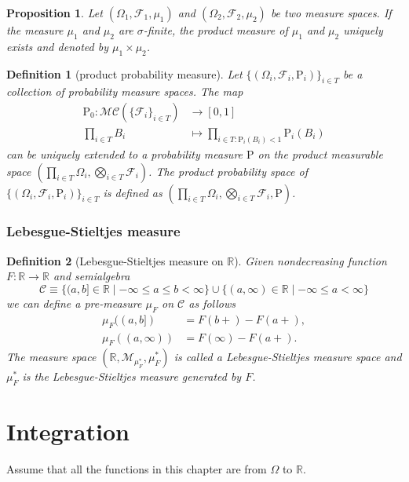 \documentclass{report}
\newtheorem{definition}{Definition}[section]
\newtheorem{proposition}{Proposition}[section]
\theoremstyle{nonumberplain}
\begin{document}
\begin{proposition}
	Let $(\Omega_1,\mathcal{F}_1,\mu_1)$ and $(\Omega_2,\mathcal{F}_2,\mu_2)$ be two measure spaces. If the measure $\mu_1$ and $\mu_2$ are $\sigma$-finite, the product measure of $\mu_1$ and $\mu_2$ uniquely exists and denoted by $\mu_1\times\mu_2$.
\end{proposition}

\begin{definition}[product probability measure]
	Let $\{(\Omega_i,\mathcal{F}_i,\mathrm{P}_i)\}_{i\in T}$ be a collection of probability measure spaces. 
	The map 
	\begin{align*}
	\mathrm{P}_0: \mathcal{MC}(\{\mathcal{F}_i\}_{i\in T})&\longrightarrow[0,1]\\
	\prod_{i\in T}B_i&\longmapsto\prod_{i\in T: \mathrm{P}_i(B_i)<1}\mathrm{P}_i\left(B_i\right)
	\end{align*}
	can be uniquely extended to a probability measure $\mathrm{P}$ on the product measurable space $\left(\prod_{i\in T}\Omega_i,\bigotimes_{i\in T}\mathcal{F}_i\right)$. The \emph{product probability space} of $\{(\Omega_i,\mathcal{F}_i,\mathrm{P}_i)\}_{i\in T}$ is defined as $\left(\prod_{i\in T}\Omega_i,\bigotimes_{i\in T}\mathcal{F}_i,\mathrm{P}\right)$.
\end{definition}

\subsection{Lebesgue-Stieltjes measure}
\begin{definition}[Lebesgue-Stieltjes measure on $\mathbb{R}$]
 Given nondecreasing function $F: \mathbb{R} \rightarrow \mathbb{R}$ and semialgebra
 \[
 \mathcal{C} \equiv\{(a, b]\in\mathbb{R}\mid-\infty \leq a \leq b<\infty\} \cup\{(a, \infty)\in\mathbb{R}\mid-\infty \leq a<\infty\}
 \]
 we can define a pre-measure $\mu_F$ on $\mathcal{C}$ as follows
 \[
	\begin{aligned}
	\mu_{F}((a, b]) &=F(b+)-F(a+), \\
	\mu_{F}((a, \infty)) &=F(\infty)-F(a+).
	\end{aligned}
 \]
 The measure space $\left(\mathbb{R}, \mathcal{M}_{\mu_{F}^{*}}, \mu_{F}^{*}\right)$ is called a \emph{Lebesgue-Stieltjes measure space} and $\mu_{F}^{*}$ is the \emph{Lebesgue-Stieltjes measure} generated by $F$.
\end{definition}

\chapter{Integration}
Assume that all the functions in this chapter are from $\Omega$ to $\mathbb{R}$.
\end{document}
